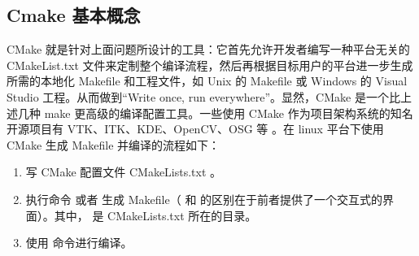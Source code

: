 \documentclass[a4paper,12pt,english]{sphinxmanual}
\begin{document}
\subsection{Cmake 基本概念}
\label{\detokenize{dev-board/clion:cmake}}
\sphinxAtStartPar
CMake 就是针对上面问题所设计的工具：它首先允许开发者编写一种平台无关的 CMakeList.txt 文件来定制整个编译流程，然后再根据目标用户的平台进一步生成所需的本地化 Makefile 和工程文件，如 Unix 的 Makefile 或 Windows 的 Visual Studio 工程。从而做到“Write once, run everywhere”。显然，CMake 是一个比上述几种 make 更高级的编译配置工具。一些使用 CMake 作为项目架构系统的知名开源项目有 VTK、ITK、KDE、OpenCV、OSG 等 。在 linux 平台下使用 CMake 生成 Makefile 并编译的流程如下：
\begin{enumerate}
%
\item {} 
\sphinxAtStartPar
写 CMake 配置文件 CMakeLists.txt 。

\item {} 
\sphinxAtStartPar
执行命令  或者  生成 Makefile（ 和  的区别在于前者提供了一个交互式的界面）。其中，  是 CMakeLists.txt 所在的目录。

\item {} 
\sphinxAtStartPar
使用  命令进行编译。

\end{enumerate}
\end{document}
